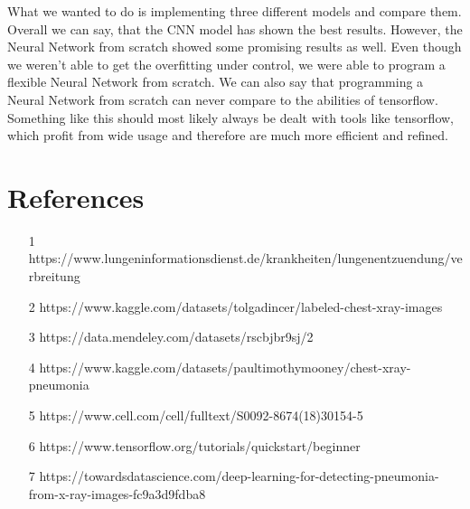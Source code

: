 \documentclass{article}
\begin{document}
What we wanted to do is implementing three different models and compare them.
Overall we can say, that the CNN model has shown the best results. However, the Neural Network from scratch showed some promising results as well. 
Even though we weren't able to get the overfitting under control, we were able to program a flexible Neural Network from scratch.
We can also say that programming a Neural Network from scratch can never compare to the abilities of tensorflow. 
Something like this should most likely always be dealt with tools like tensorflow, which profit from wide usage and therefore are much more efficient and refined.

\section{References}
\begin{enumerate}
  \item [1] https://www.lungeninformationsdienst.de/krankheiten/lungenentzuendung/verbreitung
  \item [2] https://www.kaggle.com/datasets/tolgadincer/labeled-chest-xray-images
  \item [3] https://data.mendeley.com/datasets/rscbjbr9sj/2
  \item [4] https://www.kaggle.com/datasets/paultimothymooney/chest-xray-pneumonia
  \item [5] https://www.cell.com/cell/fulltext/S0092-8674(18)30154-5
  \item [6] https://www.tensorflow.org/tutorials/quickstart/beginner
  \item [7] https://towardsdatascience.com/deep-learning-for-detecting-pneumonia-from-x-ray-images-fc9a3d9fdba8
\end{enumerate}
\end{document}
